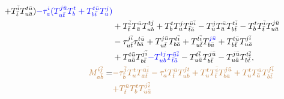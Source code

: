 \documentclass[a4paper,12pt,oneside]{book}
\newcommand{\blue}[1]{{\color{blue} #1}}
\newcommand{\brown}[1]{{\color{brown} #1}}
\newcommand{\spa}[1]{{#1}}
\newcommand{\spb}[1]{\bar{#1}}
\begin{document}
\begin{align}
                                      +T^{\spb{i}}_{\spb{t}} T^{\spa{t}\spb{u}}_{\spa{u}\spb{a}})
                                \blue{-\tau^{\spa{i}}_{\spa{a}}(T^{\spa{j}\spb{u}}_{\spa{u}\spb{t}} T^{\spa{t}}_{\spa{b}}
                                      +T^{\spa{t}\spb{u}}_{\spa{b}\spb{t}} T^{\spa{j}}_{\spa{u}})} \nonumber \\
                                     &+T^{\spb{i}}_{\spb{t}} T^{\spb{u}}_{\spb{a}} T^{\spa{t}\spa{j}}_{\spa{u}\spa{b}} 
                                      +T^{\spa{t}}_{\spa{b}} T^{\spa{j}}_{\spa{u}} T^{\spb{u}\spb{i}}_{\spb{t}\spb{a}}
                                      -T^{\spa{j}}_{\spa{u}} T^{\spb{u}}_{\spb{a}} T^{\spa{t}\spb{i}}_{\spa{b}\spb{t}}
                                      -T^{\spa{t}}_{\spa{b}} T^{\spb{i}}_{\spb{t}} T^{\spa{j}\spb{u}}_{\spa{u}\spb{a}} \nonumber \\
                                     &-\tau^{\spa{j}\spb{i}}_{\spa{u}\spb{t}} \tau^{\spa{t}\spb{u}}_{\spa{b}\bar{a}}
                                      +T^{\spa{j}\spb{u}}_{\spa{u}\spb{t}} T^{\spa{t}\spb{i}}_{\spa{b}\spb{a}}
                                      +T^{\spa{t}\spb{i}}_{\spa{u}\spb{t}} T^{\blue{\spa{j}\spb{u}}}_{\spa{b}\spb{a}} 
                                      +T^{\spa{t}\spb{u}}_{\spa{b}\spb{t}} T^{\spa{j}\spb{i}}_{\spa{u}\spb{a}} \nonumber \\
                                     &+T^{\spa{t}\spb{u}}_{\spa{u}\spb{a}} T^{\spa{j}\spb{i}}_{\spa{b}\spb{t}} 
                                \blue{-T^{\spa{t}\spa{j}}_{\spa{u}\spa{b}} T^{\spb{u}\spb{i}}_{\spb{t}\spb{a}}}
                                      -T^{\spa{t}\spb{i}}_{\spa{u}\spb{a}} T^{\spa{j}\spb{u}}_{\spa{b}\spb{t}} 
                                      -T^{\spa{j}\spb{u}}_{\spa{u}\spb{a}} T^{\spa{t}\spb{i}}_{\spa{b}\spb{t}},\\
\brown{M^{\spa{i}\spb{j}}_{\spa{a}\spb{b}}} = &\brown{-\tau^{\spb{j}}_{\spb{b}} T^{\spa{t}}_{\spa{u}} T^{\spb{u}\spb{i}}_{\spb{a}\spb{t}}
                                                      -\tau^{\spa{i}}_{\spa{a}} T^{\spb{u}}_{\spb{t}} T^{\spa{j}\spa{t}}_{\spa{u}\spa{b}}
                                                      +T^{\spa{t}}_{\spa{u}} T^{\spb{i}}_{\spb{t}} T^{\spa{j}\spb{u}}_{\spa{b}\spb{a}}
                                                      +T^{\spa{t}}_{\spa{u}} T^{\spb{u}}_{\spb{a}} T^{\spa{j}\spb{i}}_{\spa{b}\spb{t}}} \nonumber \\
                                              &\brown{+T^{\spb{u}}_{\spb{t}} T^{\spa{t}}_{\spa{b}} T^{\spa{j}\spb{i}}_{\spa{u}\spb{a}}
}
\end{align}
\end{document}
